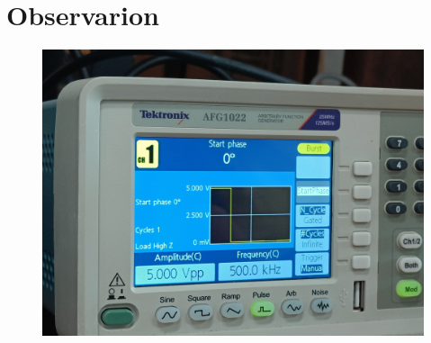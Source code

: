 \documentclass[journal]{IEEEtran}
\begin{document}
\section{Observarion}
\begin{figure}
    \centering
    \includegraphics[width=\columnwidth]{pics/WhatsApp Image 2025-01-23 at 13.22.08.jpeg}

\end{figure}
\end{document}
